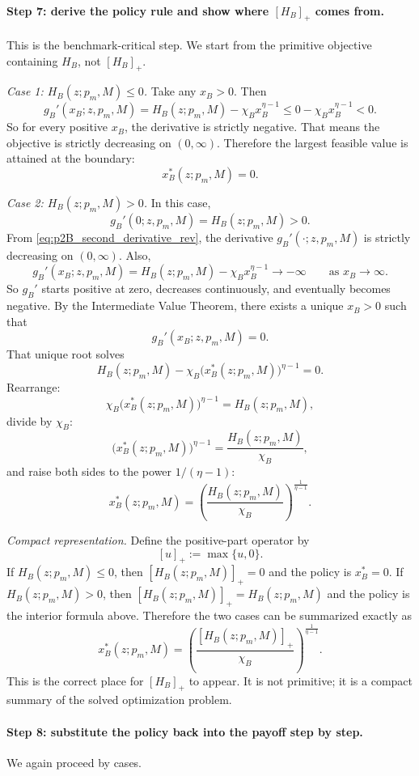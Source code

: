 \paragraph{Step 7: derive the policy rule and show where $[H_B]_+$ comes from.}
This is the benchmark-critical step. We start from the primitive objective containing $H_B$, not $[H_B]_+$.

\textit{Case 1: $H_B(z;p_m,M)\le 0$.}
Take any $x_B>0$. Then
\[
g_B'(x_B;z,p_m,M)=H_B(z;p_m,M)-\chi_B x_B^{\eta-1}\le 0-\chi_B x_B^{\eta-1}<0.
\]
So for every positive $x_B$, the derivative is strictly negative. That means the objective is strictly decreasing on $(0,\infty)$. Therefore the largest feasible value is attained at the boundary:
\[
x_B^*(z;p_m,M)=0.
\]

\textit{Case 2: $H_B(z;p_m,M)>0$.}
In this case,
\[
g_B'(0;z,p_m,M)=H_B(z;p_m,M)>0.
\]
From \eqref{eq:p2B_second_derivative_rev}, the derivative $g_B'(\cdot;z,p_m,M)$ is strictly decreasing on $(0,\infty)$. Also,
\[
g_B'(x_B;z,p_m,M)=H_B(z;p_m,M)-\chi_B x_B^{\eta-1}\to -\infty
\qquad\text{as }x_B\to\infty.
\]
So $g_B'$ starts positive at zero, decreases continuously, and eventually becomes negative. By the Intermediate Value Theorem, there exists a unique $x_B>0$ such that
\[
g_B'(x_B;z,p_m,M)=0.
\]
That unique root solves
\[
H_B(z;p_m,M)-\chi_B \bigl(x_B^*(z;p_m,M)\bigr)^{\eta-1}=0.
\]
Rearrange:
\[
\chi_B \bigl(x_B^*(z;p_m,M)\bigr)^{\eta-1}=H_B(z;p_m,M),
\]
divide by $\chi_B$:
\[
\bigl(x_B^*(z;p_m,M)\bigr)^{\eta-1}=\frac{H_B(z;p_m,M)}{\chi_B},
\]
and raise both sides to the power $1/(\eta-1)$:
\[
x_B^*(z;p_m,M)=\left(\frac{H_B(z;p_m,M)}{\chi_B}\right)^{\frac{1}{\eta-1}}.
\]

\textit{Compact representation.}
Define the positive-part operator by
\[
[u]_+:=\max\{u,0\}.
\]
If $H_B(z;p_m,M)\le 0$, then $[H_B(z;p_m,M)]_+=0$ and the policy is $x_B^*=0$. If $H_B(z;p_m,M)>0$, then $[H_B(z;p_m,M)]_+=H_B(z;p_m,M)$ and the policy is the interior formula above. Therefore the two cases can be summarized exactly as
\begin{equation}
x_B^*(z;p_m,M)=\left(\frac{[H_B(z;p_m,M)]_+}{\chi_B}\right)^{\frac{1}{\eta-1}}.
\label{eq:p2B_policy_rev}
\end{equation}
This is the correct place for $[H_B]_+$ to appear. It is not primitive; it is a compact summary of the solved optimization problem.

\paragraph{Step 8: substitute the policy back into the payoff step by step.}
We again proceed by cases.

